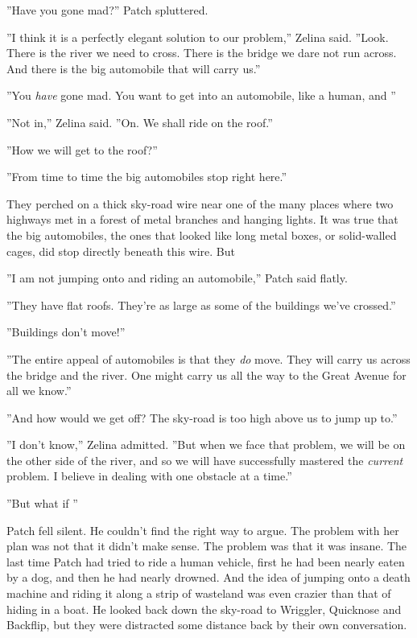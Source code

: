 \documentclass[12pt]{book}
\begin{document}
''Have you gone mad?'' Patch spluttered.

''I think it is a perfectly elegant solution to our problem,'' Zelina said. ''Look. There is the river we need to cross. There is the bridge we dare not run across. And there is the big automobile that will carry us.''

''You {\it have} gone mad. You want to get into an automobile, like a human, and %
''

''Not in,'' Zelina said. ''On. We shall ride on the roof.''

''How we will get to the roof?''

''From time to time the big automobiles stop right here.''

They perched on a thick sky-road wire near one of the many places where two highways met in a forest of metal branches and hanging lights. It was true that the big automobiles, the ones that looked like long metal boxes, or solid-walled cages, did stop directly beneath this wire. But %

''I am not jumping onto and riding an automobile,'' Patch said flatly.

''They have flat roofs. They're as large as some of the buildings we've crossed.''

''Buildings don't move!''

''The entire appeal of automobiles is that they {\it do} move. They will carry us across the bridge and the river. One might carry us all the way to the Great Avenue for all we know.''

''And how would we get off? The sky-road is too high above us to jump up to.''

''I don't know,'' Zelina admitted. ''But when we face that problem, we will be on the other side of the river, and so we will have successfully mastered the {\it current} problem. I believe in dealing with one obstacle at a time.''

''But%
what if%
''

Patch fell silent. He couldn't find the right way to argue. The problem with her plan was not that it didn't make sense. The problem was that it was insane. The last time Patch had tried to ride a human vehicle, first he had been nearly eaten by a dog, and then he had nearly drowned. And the idea of jumping onto a death machine and riding it along a strip of wasteland was even crazier than that of hiding in a boat. He looked back down the sky-road to Wriggler, Quicknose and Backflip, but they were distracted some distance back by their own conversation.
\end{document}
